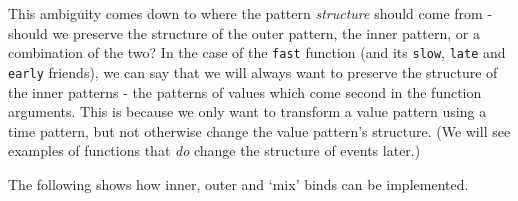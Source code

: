 This ambiguity comes down to where the pattern \emph{structure} should
come from - should we preserve the structure of the outer pattern, the
inner pattern, or a combination of the two? In the case of the
\texttt{fast} function (and its \texttt{slow}, \texttt{late} and
\texttt{early} friends), we can say that we will always want to preserve
the structure of the inner patterns - the patterns of values which come
second in the function arguments. This is because we only want to
transform a value pattern using a time pattern, but not otherwise change
the value pattern's structure. (We will see examples of functions that
\emph{do} change the structure of events later.)

The following shows how inner, outer and `mix' binds can be implemented.

\begin{Shaded}
\begin{Highlighting}[]
\NormalTok{ (}  \OtherTok{{-}\textgreater{}}   \OtherTok{{-}\textgreater{}}  \NormalTok{) }\OtherTok{{-}\textgreater{}}
                \OtherTok{{-}\textgreater{}}\OtherTok{{-}\textgreater{}} \OtherTok{{-}\textgreater{}} 
\OtherTok{=}  \OperatorTok{$} 
  \OtherTok{=} \OperatorTok{$}\OperatorTok{$}\OperatorTok{$}
\OtherTok{=}\OtherTok{=}

 \OtherTok{{-}\textgreater{}}\OtherTok{{-}\textgreater{}} \OtherTok{{-}\textgreater{}} 
\OtherTok{=} \NormalTok{)}

 \OtherTok{{-}\textgreater{}}\OtherTok{{-}\textgreater{}} \OtherTok{{-}\textgreater{}} 
\OtherTok{=}

 \OtherTok{{-}\textgreater{}}\OtherTok{{-}\textgreater{}} \OtherTok{{-}\textgreater{}} 
\OtherTok{=}
\end{Highlighting}
\end{Shaded}

